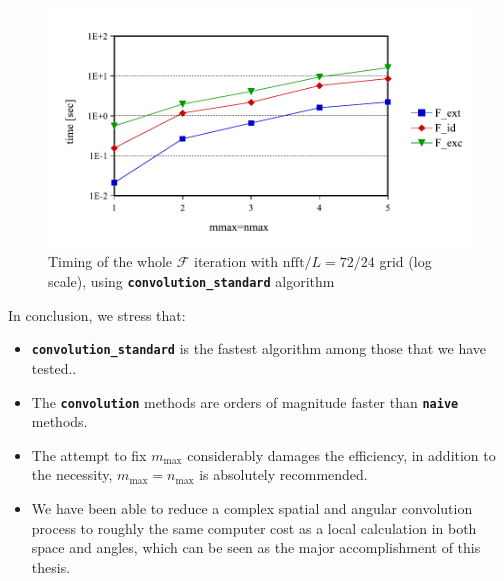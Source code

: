 \begin{figure}[H]
\begin{centering}
\includegraphics[bb=0bp 20bp 453bp 236bp,scale=0.65]{_figure/results/global_perf}
\par\end{centering}
\caption[Timing of the whole $\mathcal{F}$ iteration]{Timing of the whole $\mathcal{F}$ iteration with $\mathrm{nfft}/L=72/24$
grid (log scale), using \texttt{\textbf{convolution\_standard}} algorithm
\label{fig:Timing-full}}
\end{figure}

In conclusion, we stress that:
\begin{itemize}
\item \texttt{\textbf{convolution\_standard}} is the fastest algorithm among
those that we have tested..
\item The \texttt{\textbf{convolution}} methods are orders of magnitude
faster than \texttt{\textbf{naive}} methods.
\item The attempt to fix $m_{\max}$ considerably damages the efficiency,
in addition to the necessity, $m_{\max}=n_{\max}$ is absolutely recommended.
\item We have been able to reduce a complex spatial and angular convolution
process to roughly the same computer cost as a local calculation in
both space and angles, which can be seen as the major accomplishment
of this thesis. \newpage{}
\end{itemize}
$ $

